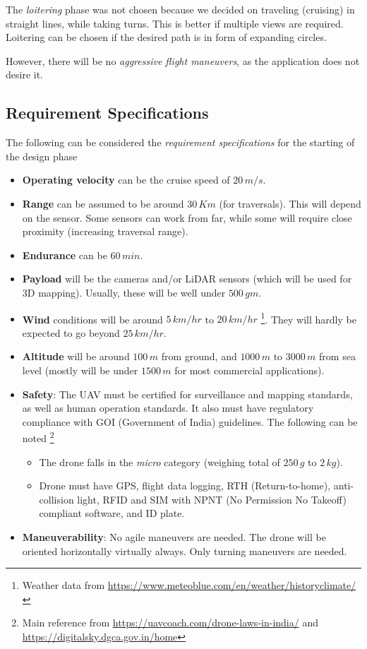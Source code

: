 The \textit{loitering} phase was not chosen because we decided on traveling (cruising) in straight lines, while taking turns. This is better if multiple views are required. Loitering can be chosen if the desired path is in form of expanding circles. 

However, there will be no \textit{aggressive flight maneuvers}, as the application does not desire it.

\subsection{Requirement Specifications}

The following can be considered the \emph{requirement specifications} for the starting of the design phase

\begin{itemize}
    \item \textbf{Operating velocity} can be the cruise speed of $20\,m/s$.
    \item \textbf{Range} can be assumed to be around $30\,Km$ (for traversals). This will depend on the sensor. Some sensors can work from far, while some will require close proximity (increasing traversal range).
    \item \textbf{Endurance} can be $60\,min$.
    \item \textbf{Payload} will be the cameras and/or LiDAR sensors (which will be used for 3D mapping). Usually, these will be well under $500\,gm$.
    \item \textbf{Wind} conditions will be around $5\,km/hr$ to $20\,km/hr$ \footnote{Weather data from \url{https://www.meteoblue.com/en/weather/historyclimate/}}. They will hardly be expected to go beyond $25\,km/hr$.
    \item \textbf{Altitude} will be around $100\,m$ from ground, and $1000\,m$ to $3000\,m$ from sea level (mostly will be under $1500\,m$ for most commercial applications).
    \item \textbf{Safety}: The UAV must be certified for surveillance and mapping standards, as well as human operation standards. It also must have regulatory compliance with GOI (Government of India) guidelines. The following can be noted \footnote{Main reference from \url{https://uavcoach.com/drone-laws-in-india/} and \url{https://digitalsky.dgca.gov.in/home}}
    \begin{itemize}
        \item The drone falls in the \emph{micro} category (weighing total of $250 \, g$ to $2 \, kg$).
        \item Drone must have GPS, flight data logging, RTH (Return-to-home), anti-collision light, RFID and SIM with NPNT (No Permission No Takeoff) compliant software, and ID plate.
    \end{itemize}
    \item \textbf{Maneuverability}: No agile maneuvers are needed. The drone will be oriented horizontally virtually always. Only turning maneuvers are needed.
\end{itemize}


